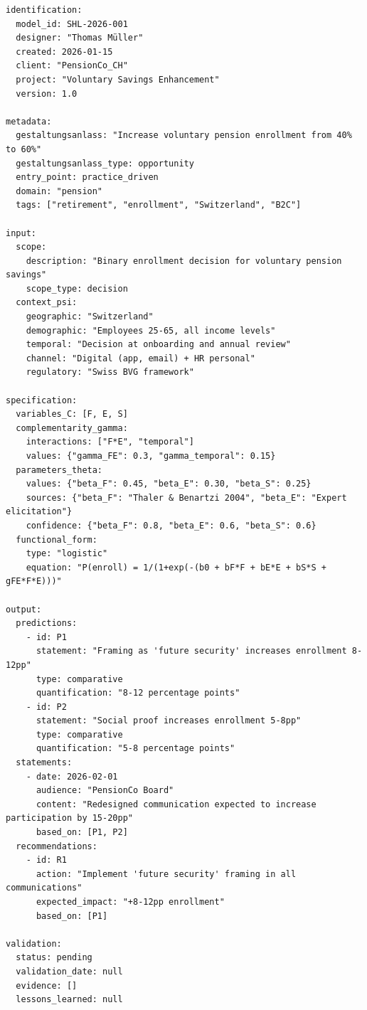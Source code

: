 \begin{tcolorbox}[colback=white, colframe=black,
    title=Example Registry Entry: SHL-2026-001]
\begin{verbatim}
identification:
  model_id: SHL-2026-001
  designer: "Thomas Müller"
  created: 2026-01-15
  client: "PensionCo_CH"
  project: "Voluntary Savings Enhancement"
  version: 1.0

metadata:
  gestaltungsanlass: "Increase voluntary pension enrollment from 40% to 60%"
  gestaltungsanlass_type: opportunity
  entry_point: practice_driven
  domain: "pension"
  tags: ["retirement", "enrollment", "Switzerland", "B2C"]

input:
  scope:
    description: "Binary enrollment decision for voluntary pension savings"
    scope_type: decision
  context_psi:
    geographic: "Switzerland"
    demographic: "Employees 25-65, all income levels"
    temporal: "Decision at onboarding and annual review"
    channel: "Digital (app, email) + HR personal"
    regulatory: "Swiss BVG framework"

specification:
  variables_C: [F, E, S]
  complementarity_gamma:
    interactions: ["F*E", "temporal"]
    values: {"gamma_FE": 0.3, "gamma_temporal": 0.15}
  parameters_theta:
    values: {"beta_F": 0.45, "beta_E": 0.30, "beta_S": 0.25}
    sources: {"beta_F": "Thaler & Benartzi 2004", "beta_E": "Expert elicitation"}
    confidence: {"beta_F": 0.8, "beta_E": 0.6, "beta_S": 0.6}
  functional_form:
    type: "logistic"
    equation: "P(enroll) = 1/(1+exp(-(b0 + bF*F + bE*E + bS*S + gFE*F*E)))"

output:
  predictions:
    - id: P1
      statement: "Framing as 'future security' increases enrollment 8-12pp"
      type: comparative
      quantification: "8-12 percentage points"
    - id: P2
      statement: "Social proof increases enrollment 5-8pp"
      type: comparative
      quantification: "5-8 percentage points"
  statements:
    - date: 2026-02-01
      audience: "PensionCo Board"
      content: "Redesigned communication expected to increase participation by 15-20pp"
      based_on: [P1, P2]
  recommendations:
    - id: R1
      action: "Implement 'future security' framing in all communications"
      expected_impact: "+8-12pp enrollment"
      based_on: [P1]

validation:
  status: pending
  validation_date: null
  evidence: []
  lessons_learned: null
\end{verbatim}
\end{tcolorbox}


